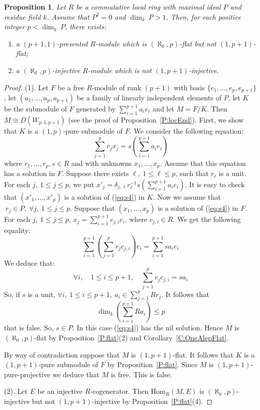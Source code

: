 \documentclass{amsart}
\newtheorem{proposition}[theorem]{Proposition}
\begin{document}
\begin{proposition}
\label{P:ExFlat} Let $R$ be a commutative local ring with maximal ideal $P$ and residue field $k$. Assume that $P^2=0$ and $\dim_k\ P>1$. Then, for each positive integer $p<\dim_k\ P$, there exists:
\begin{enumerate}
\item a $(p+1,1)$-presented  $R$-module which is $(\aleph_0,p)$-flat but not $(1,p+1)$-flat;
\item a $(\aleph_0,p)$-injective $R$-module which is not $(1,p+1)$-injective.
\end{enumerate}
\end{proposition}
\begin{proof}
(1). Let $F$ be a free $R$-module of rank $(p+1)$ with basis $\{e_1,\dots,e_p,e_{p+1}\}$, let $(a_1,\dots,a_p,a_{p+1})$ be a family of linearly independent elements of $P$, let $K$ be the submodule of $F$ generated by $\sum_{i=1}^{p+1}a_ie_i$ and let $M=F/K$. Then $M\cong D(W_{p,1,p+1})$ (see the  proof of Proposition~\ref{P:locEnd}). First, we show that $K$ is a $(1,p)$-pure submodule of $F$. We consider the following equation:
\begin{equation}\label{eq:s4}
\sum_{j=1}^pr_jx_j=s(\sum_{i=1}^{p+1}a_ie_i)
\end{equation}
where $r_1,\dots,r_p,s\in R$ and with unknowns $x_1,\dots,x_p$. Assume that this equation has a solution in $F$. Suppose there exists $\ell,\ 1\leq\ell\leq p$, such that $r_{\ell}$ is a unit. For each $j,\ 1\leq j\leq p$, we put $x'_j=\delta_{j,\ell}r_{\ell}^{-1}s(\sum_{i=1}^{p+1}a_ie_i)$. It is easy to check that $(x'_1,\dots,x'_p)$ is a solution of (\ref{eq:s4}) in $K$. Now we assume that $\ r_j\in P,\ \forall j,\ 1\leq j\leq p$. Suppose that $(x_1,\dots,x_p)$ is a solution of (\ref{eq:s4}) in $F$. For each $j,\ 1\leq j\leq p$, $x_j=\sum_{i=1}^{p+1}c_{j,i}e_i$, where $c_{j,i}\in R$. We get the following equality:
\begin{equation}
\sum_{i=1}^{p+1}\left( \sum_{j=1}^pr_jc_{j,i}\right) e_i=\sum_{i=1}^{p+1}sa_ie_i
\end{equation}
We deduce that:
\begin{equation}
\forall i,\quad 1\leq i\leq p+1,\quad\sum_{j=1}^pr_jc_{j,i}=sa_i
\end{equation}
So, if $s$ is a unit, $\forall i,\ 1\leq i\leq p+1,\ a_i\in\sum_{j=1}^pRr_j$. It  follows that \[\dim_k\left( \sum_{i=1}^{p+1}Ra_i\right) \leq p\] that is false. So, $s\in P$. In this case (\ref{eq:s4}) has the nil solution. Hence $M$ is $(\aleph_0,p)$-flat by Proposition~\ref{P:flat}(2) and Corollary~\ref{C:OneAlepFlat}.

By way of contradiction suppose that $M$ is $(1,p+1)$-flat. It follows that $K$ is a $(1,p+1)$-pure submodule of $F$ by Proposition~\ref{P:flat}. Since $M$ is $(1,p+1)$-pure-projective we deduce that $M$ is free. This is false.

(2). Let $E$ be an injective $R$-cogenerator. Then $\mathrm{Hom}_R(M,E)$ is $(\aleph_0,p)$-injective but not $(1,p+1)$-injective by Proposition~\ref{P:flat}(4).
\end{proof}
\end{document}
